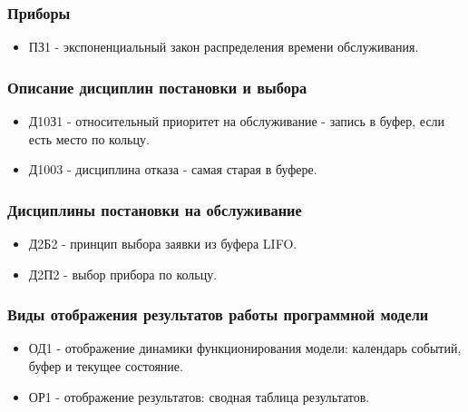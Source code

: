 \documentclass[a4paper, 14pt]{article}
\begin{document}
\subsubsection{Приборы}
\begin{itemize}
	\item ПЗ1 - экспоненциальный закон распределения времени обслуживания.
\end{itemize}

\subsubsection{Описание дисциплин постановки и выбора}
\begin{itemize}
	\item Д10З1 - относительный приоритет на обслуживание - запись в буфер, если есть место по кольцу.
	\item Д1003 - дисциплина отказа - самая старая в буфере.
\end{itemize}

\subsubsection{Дисциплины постановки на обслуживание}
\begin{itemize}
	\item Д2Б2 - принцип выбора заявки из буфера LIFO.
	\item Д2П2 - выбор прибора по кольцу.
\end{itemize}

\subsubsection{Виды отображения результатов работы программной модели}
\begin{itemize}
	\item ОД1 - отображение динамики функционирования модели: календарь событий, буфер и текущее состояние.
	\item ОР1 - отображение результатов: сводная таблица результатов.
\end{itemize}
\end{document}
